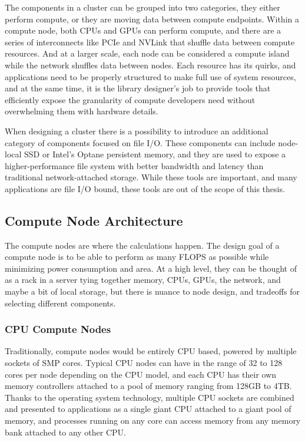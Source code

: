 The components in a cluster can be grouped into two categories, they either perform compute, or they are moving data between compute endpoints.
Within a compute node, both CPUs and GPUs can perform compute, and there are a series of interconnects like PCIe and NVLink that shuffle data between compute resources.
And at a larger scale, each node can be considered a compute island while the network shuffles data between nodes.
Each resource has its quirks, and applications need to be properly structured to make full use of system resources, and at the same time, it is the library designer's job to provide tools that efficiently expose the granularity of compute developers need without overwhelming them with hardware details.

When designing a cluster there is a possibility to introduce an additional category of components focused on file I/O.
These components can include node-local SSD or Intel's Optane persistent memory, and they are used to expose a higher-performance file system with better bandwidth and latency than traditional network-attached storage.
While these tools are important, and many applications are file I/O bound, these tools are out of the scope of this thesis. 

\subsection{Compute Node Architecture}
The compute nodes are where the calculations happen.
The design goal of a compute node is to be able to perform as many FLOPS as possible while minimizing power consumption and area.
At a high level, they can be thought of as a rack in a server tying together memory, CPUs, GPUs, the network, and maybe a bit of local storage, but there is nuance to node design, and tradeoffs for selecting different components. 

\subsubsection{CPU Compute Nodes}
Traditionally, compute nodes would be entirely CPU based, powered by multiple sockets of SMP cores.
Typical CPU nodes can have in the range of 32 to 128 cores per node depending on the CPU model, and each CPU has their own memory controllers attached to a pool of memory ranging from 128GB to 4TB.
Thanks to the operating system technology, multiple CPU sockets are combined and presented to applications as a single giant CPU attached to a giant pool of memory, and processes running on any core can access memory from any memory bank attached to any other CPU.

